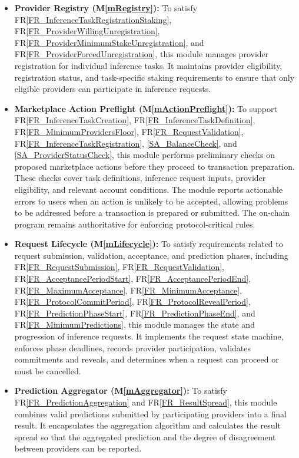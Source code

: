 \documentclass[12pt, titlepage]{article}
\newcommand{\mref}[1]{M\ref{#1}}
\newcommand{\rref}[1]{FR\ref{#1}}
\begin{document}
\begin{itemize}

    \item \textbf{Provider Registry (\mref{mRegistry}):}
    To satisfy \rref{FR_InferenceTaskRegistrationStaking},
    \rref{FR_ProviderWillingUnregistration},
    \rref{FR_ProviderMinimumStakeUnregistration}, and
    \rref{FR_ProviderForcedUnregistration}, this module manages provider
    registration for individual inference tasks. It maintains provider
    eligibility, registration status, and task-specific staking
    requirements to ensure that only eligible providers can participate
    in inference requests.


    \item \textbf{Marketplace Action Preflight (\mref{mActionPreflight}):}
    To support \rref{FR_InferenceTaskCreation},
    \rref{FR_InferenceTaskDefinition},
    \rref{FR_MinimumProvidersFloor},
    \rref{FR_RequestValidation},
    \rref{FR_InferenceTaskRegistration},
    \ref{SA_BalanceCheck}, and
    \ref{SA_ProviderStatusCheck}, this module performs preliminary checks
    on proposed marketplace actions before they proceed to transaction
    preparation. These checks cover task definitions, inference request
    inputs, provider eligibility, and relevant account conditions. The
    module reports actionable errors to users when an action is unlikely
    to be accepted, allowing problems to be addressed before a transaction
    is prepared or submitted. The on-chain program remains authoritative
    for enforcing protocol-critical rules.


    \item \textbf{Request Lifecycle (\mref{mLifecycle}):}
    To satisfy requirements related to request submission, validation,
    acceptance, and prediction phases, including
    \rref{FR_RequestSubmission},
    \rref{FR_RequestValidation},
    \rref{FR_AcceptancePeriodStart},
    \rref{FR_AcceptancePeriodEnd},
    \rref{FR_MaximumAcceptance},
    \rref{FR_MinimumAcceptance},
    \rref{FR_ProtocolCommitPeriod},
    \rref{FR_ProtocolRevealPeriod},
    \rref{FR_PredictionPhaseStart},
    \rref{FR_PredictionPhaseEnd}, and
    \rref{FR_MinimumPredictions}, this module manages the state and
    progression of inference requests. It implements the request state
    machine, enforces phase deadlines, records provider participation,
    validates commitments and reveals, and determines when a request
    can proceed or must be cancelled.

    \item \textbf{Prediction Aggregator (\mref{mAggregator}):}
    To satisfy \rref{FR_PredictionAggregation} and
    \rref{FR_ResultSpread}, this module combines valid predictions
    submitted by participating providers into a final result. It
    encapsulates the aggregation algorithm and calculates the result
    spread so that the aggregated prediction and the degree of
    disagreement between providers can be reported.


\end{itemize}
\end{document}
